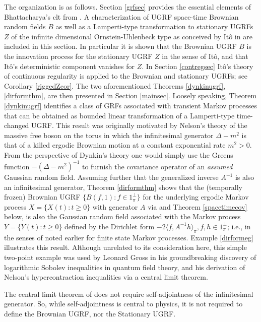 \documentclass[11pt]{article}
\numberwithin{equation}{section}
\theoremstyle{definition}
\theoremstyle{remark}
\theoremstyle{definition}
\begin{document}
The organization is as follows. 
 Section \ref{grfsec}  provides the essential elements of Bhattacharya’s
clt from \cite{RBfclt}.  
 A characterization of UGRF
space-time Brownian random fields $B$ as well as a Lamperti-type transformation
to stationary UGRFs $Z$ of the infinite dimensional Ornstein-Uhlenbeck type
as conceived by  It\^o in \cite{ito} are included in this section. 
In particular it is shown that the Brownian UGRF $B$ is the
innovation process for the stationary UGRF $Z$ in the sense
of It\^o, and that It\^o's deterministic component vanishes
for $Z$. 
In Section \ref{contregsec} It\^o's theory of continuous
regularity is applied to the Brownian and stationary 
UGRFs; see Corollary \ref{riggedZcor}.
The two aforementioned Theorems \ref{dynkinugrf},  \ref{dirformthm},
are then presented in Section \ref{mainsec}. Loosely speaking, %
Theorem \ref{dynkinugrf} identifies
a class of GRFs associated with transient Markov processes that can be obtained as bounded
linear transformation of a Lamperti-type time-changed UGRF.
This result was originally motivated by
Nelson’s theory of the massive free boson on the torus in which the infinitesimal generator $\Delta-m^2$  is
that of a 
killed ergodic Brownian motion at a constant exponential rate $m^2> 0$.
From the perspective of 
Dynkin’s theory one would simply use the 
Greens function $-(\Delta-m^2)^{-1}$ to furnish the 
covariance operator of an {\it assumed} Gaussian random field.   
 Assuming further that the generalized
inverse  $A^{-1}$ is also
an infinitesimal generator, Theorem \ref{dirformthm}
 shows that the (temporally frozen) Brownian UGRF 
$\{B(f,1):f\in1^\perp_\pi\}$ for the underlying  ergodic
Markov process $X=\{X(t):t\ge 0\}$ with generator $A$ via \cite{RBfclt}
and Theorem \ref{spacetimecov} below, 
 is also the Gaussian random field 
associated with the Markov process $Y=\{Y(t): t\ge 0\}$  
defined by the Dirichlet form $-2\langle f,A^{-1}h\rangle_\pi,
f,h\in1_\pi^\perp$; i.e., in the senses of \cites{Dynkin1,DiaconisEvans}
noted earlier for finite state Markov processes.  
Example \ref{dirformeg} illustrates this 
result.  Although unrelated to its consideration here, this  simple 
two-point example was used  by Leonard Gross \cite{gross}
in his groundbreaking discovery of logarithmic Sobolev inequalities
in quantum field theory, and his derivation of  Nelson's hypercontraction
inequalities \cite{Nelson} via a central limit theorem. 

The
central limit theorem of \cite{RBfclt} does not require self-adjointness of
the infinitesimal generator.
So, while self-adjointness is central to physics, it is not required to define the Brownian UGRF,
nor the Stationary UGRF.
\end{document}
